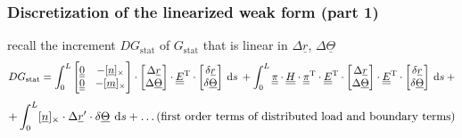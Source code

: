 



\begin{frame}
  \frametitle{Discretization of the linearized weak form (part 1)}

  recall the increment $DG_{\text{stat}}$ of $G_{\text{stat}}$ that is linear in $\Delta \underline{r}$, $\Delta \underline{\Theta}$
  \begin{displaymath}
    DG_{\text{stat}} =
    \int_0^L
      \begin{bmatrix}
        \doubleunderline{0} & - [ \underline{n} ]_{\times} \\
        \doubleunderline{0} & - [ \underline{m} ]_{\times}
      \end{bmatrix} \cdot
      \begin{bmatrix}
        \Delta \underline{r} \\
        \Delta \underline{\Theta}
      \end{bmatrix} \cdot
      \doubleunderline{E}^{\mathrm{T}} \cdot
      \begin{bmatrix}
        \delta \underline{r} \\ \delta \underline{\Theta}
      \end{bmatrix}
    \: \dif s \:
    + \int_0^L
      \doubleunderline{\pi} \cdot
      \doubleunderline{H} \cdot
      \doubleunderline{\pi}^{\mathrm{T}} \cdot
      \doubleunderline{E}^{\mathrm{T}} \cdot
      \begin{bmatrix}
        \Delta \underline{r} \\
        \Delta \underline{\Theta}
      \end{bmatrix} \cdot
      \doubleunderline{E}^{\mathrm{T}} \cdot
      \begin{bmatrix}
        \delta \underline{r} \\ \delta \underline{\Theta}
      \end{bmatrix}
    \: \dif s \: +
  \end{displaymath}
  \begin{displaymath}
   + \int_0^L
      [ \underline{n} ]_{\times} \cdot \Delta \underline{r}^{\prime} \cdot \delta \underline{\Theta}
    \: \dif s
   + \dots (\text{first order terms of distributed load and boundary terms})
  \end{displaymath}


\end{frame}
